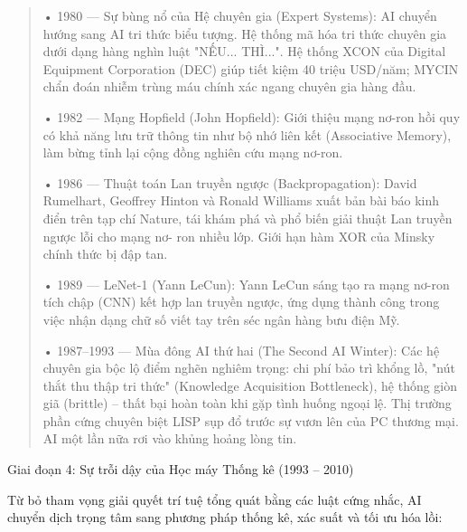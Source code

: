 \begin{quote}
• 1980 --- Sự bùng nổ của Hệ chuyên gia (Expert Systems): AI chuyển
hướng sang AI tri thức biểu tượng. Hệ thống mã hóa tri thức chuyên gia
dưới dạng hàng nghìn luật "NẾU... THÌ...". Hệ thống XCON của Digital
Equipment Corporation (DEC) giúp tiết kiệm 40 triệu USD/năm; MYCIN chẩn
đoán nhiễm trùng máu chính xác ngang chuyên gia hàng đầu.

• 1982 --- Mạng Hopfield (John Hopfield): Giới thiệu mạng nơ-ron hồi quy
có khả năng lưu trữ thông tin như bộ nhớ liên kết (Associative Memory),
làm bừng tỉnh lại cộng đồng nghiên cứu mạng nơ-ron.

• 1986 --- Thuật toán Lan truyền ngược (Backpropagation): David
Rumelhart, Geoffrey Hinton và Ronald Williams xuất bản bài báo kinh điển
trên tạp chí Nature, tái khám phá và phổ biến giải thuật Lan truyền
ngược lỗi cho mạng nơ- ron nhiều lớp. Giới hạn hàm XOR của Minsky chính
thức bị đập tan.

• 1989 --- LeNet-1 (Yann LeCun): Yann LeCun sáng tạo ra mạng nơ-ron tích
chập (CNN) kết hợp lan truyền ngược, ứng dụng thành công trong việc nhận
dạng chữ số viết tay trên séc ngân hàng bưu điện Mỹ.

• 1987--1993 --- Mùa đông AI thứ hai (The Second AI Winter): Các hệ
chuyên gia bộc lộ điểm nghẽn nghiêm trọng: chi phí bảo trì khổng lồ,
"nút thắt thu thập tri thức" (Knowledge Acquisition Bottleneck), hệ
thống giòn giã (brittle) -- thất bại hoàn toàn khi gặp tình huống ngoại
lệ. Thị trường phần cứng chuyên biệt LISP sụp đổ trước sự vươn lên của
PC thương mại. AI một lần nữa rơi vào khủng hoảng lòng tin.
\end{quote}

Giai đoạn 4: Sự trỗi dậy của Học máy Thống kê (1993 -- 2010)

Từ bỏ tham vọng giải quyết trí tuệ tổng quát bằng các luật cứng nhắc, AI
chuyển dịch trọng tâm sang phương pháp thống kê, xác suất và tối ưu hóa
lồi:

